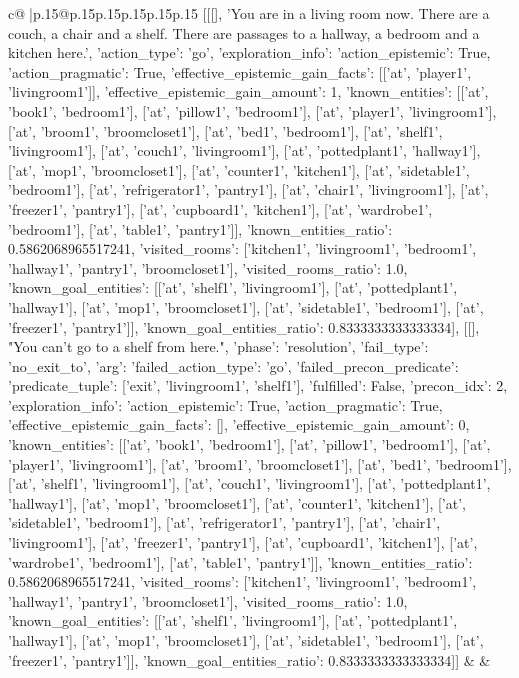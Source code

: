 \documentclass{article}
\begin{document}
{\begin{supertabular}{c@{$\;$}|p{.15\linewidth}@{}p{.15\linewidth}p{.15\linewidth}p{.15\linewidth}p{.15\linewidth}p{.15\linewidth}}
{{{	 [[[], 'You are in a living room now. There are a couch, a chair and a shelf. There are passages to a hallway, a bedroom and a kitchen here.', {'action_type': 'go', 'exploration_info': {'action_epistemic': True, 'action_pragmatic': True, 'effective_epistemic_gain_facts': [['at', 'player1', 'livingroom1']], 'effective_epistemic_gain_amount': 1, 'known_entities': [['at', 'book1', 'bedroom1'], ['at', 'pillow1', 'bedroom1'], ['at', 'player1', 'livingroom1'], ['at', 'broom1', 'broomcloset1'], ['at', 'bed1', 'bedroom1'], ['at', 'shelf1', 'livingroom1'], ['at', 'couch1', 'livingroom1'], ['at', 'pottedplant1', 'hallway1'], ['at', 'mop1', 'broomcloset1'], ['at', 'counter1', 'kitchen1'], ['at', 'sidetable1', 'bedroom1'], ['at', 'refrigerator1', 'pantry1'], ['at', 'chair1', 'livingroom1'], ['at', 'freezer1', 'pantry1'], ['at', 'cupboard1', 'kitchen1'], ['at', 'wardrobe1', 'bedroom1'], ['at', 'table1', 'pantry1']], 'known_entities_ratio': 0.5862068965517241, 'visited_rooms': ['kitchen1', 'livingroom1', 'bedroom1', 'hallway1', 'pantry1', 'broomcloset1'], 'visited_rooms_ratio': 1.0, 'known_goal_entities': [['at', 'shelf1', 'livingroom1'], ['at', 'pottedplant1', 'hallway1'], ['at', 'mop1', 'broomcloset1'], ['at', 'sidetable1', 'bedroom1'], ['at', 'freezer1', 'pantry1']], 'known_goal_entities_ratio': 0.8333333333333334}}], [[], "You can't go to a shelf from here.", {'phase': 'resolution', 'fail_type': 'no_exit_to', 'arg': {'failed_action_type': 'go', 'failed_precon_predicate': {'predicate_tuple': ['exit', 'livingroom1', 'shelf1'], 'fulfilled': False, 'precon_idx': 2}}, 'exploration_info': {'action_epistemic': True, 'action_pragmatic': True, 'effective_epistemic_gain_facts': [], 'effective_epistemic_gain_amount': 0, 'known_entities': [['at', 'book1', 'bedroom1'], ['at', 'pillow1', 'bedroom1'], ['at', 'player1', 'livingroom1'], ['at', 'broom1', 'broomcloset1'], ['at', 'bed1', 'bedroom1'], ['at', 'shelf1', 'livingroom1'], ['at', 'couch1', 'livingroom1'], ['at', 'pottedplant1', 'hallway1'], ['at', 'mop1', 'broomcloset1'], ['at', 'counter1', 'kitchen1'], ['at', 'sidetable1', 'bedroom1'], ['at', 'refrigerator1', 'pantry1'], ['at', 'chair1', 'livingroom1'], ['at', 'freezer1', 'pantry1'], ['at', 'cupboard1', 'kitchen1'], ['at', 'wardrobe1', 'bedroom1'], ['at', 'table1', 'pantry1']], 'known_entities_ratio': 0.5862068965517241, 'visited_rooms': ['kitchen1', 'livingroom1', 'bedroom1', 'hallway1', 'pantry1', 'broomcloset1'], 'visited_rooms_ratio': 1.0, 'known_goal_entities': [['at', 'shelf1', 'livingroom1'], ['at', 'pottedplant1', 'hallway1'], ['at', 'mop1', 'broomcloset1'], ['at', 'sidetable1', 'bedroom1'], ['at', 'freezer1', 'pantry1']], 'known_goal_entities_ratio': 0.8333333333333334}}]] 
	  } 
	   } 
	   } 
	 & & \\ 
 


\end{supertabular}}
\end{document}
